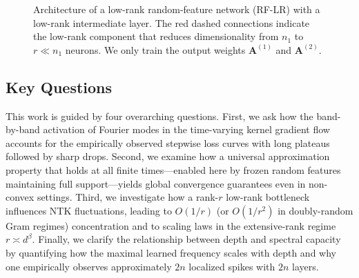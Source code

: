 \documentclass{article}
\begin{document}
\begin{figure}[htbp]
    \caption{Architecture of a low-rank random-feature network (RF-LR) with a low-rank intermediate layer. The red dashed connections indicate the low-rank component that reduces dimensionality from $n_1$ to $r \ll n_1$ neurons.
    We only train the output weights $\bm{A}^{(1)}$ and $\bm{A}^{(2)}$.}
    \label{fig:mmnn_architecture}
\end{figure}

\subsection*{Key Questions}
This work is guided by four overarching questions. First, we ask how the band-by-band activation of Fourier modes in the time-varying kernel gradient flow accounts for the empirically observed stepwise loss curves with long plateaus followed by sharp drops. Second, we examine how a universal approximation property that holds at all finite times—enabled here by frozen random features maintaining full support—yields global convergence guarantees even in non-convex settings. Third, we investigate how a rank-\( r \) low-rank bottleneck influences NTK fluctuations, leading to \( O(1/r) \) (or \( O(1/r^2) \) in doubly-random Gram regimes) concentration and to scaling laws in the extensive-rank regime \( r \asymp d^\beta \). Finally, we clarify the relationship between depth and spectral capacity by quantifying how the maximal learned frequency scales with depth and why one empirically observes approximately \( 2n \) localized spikes with \( 2n \) layers.
\end{document}
